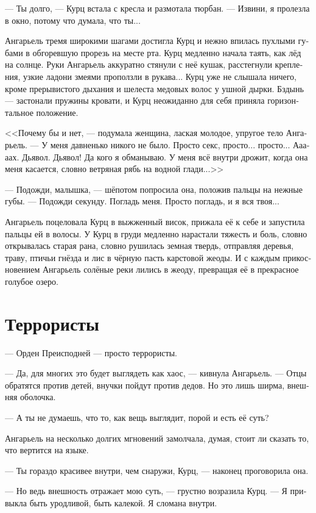 \documentclass[a4paper,12pt,fleqn]{book}\usepackage{cooltooltips}\usepackage{polyglossia}\setdefaultlanguage[babelshorthands=true]{russian}\setotherlanguage{english}\defaultfontfeatures{Ligatures=TeX,Mapping=tex-text} \usepackage{xcolor}\definecolor{lightgray}{HTML}{bbbbbb}\color{lightgray}\newcommand{\ml}[3]{\textenglish{\textcolor{black}{#3}}}
\begin{document}
--- Ты долго, --- Курц встала с кресла и размотала тюрбан.
--- Извини, я пролезла в окно, потому что думала, что ты...

Ангарьель тремя широкими шагами достигла Курц и нежно впилась пухлыми губами в обгоревшую прорезь на месте рта.
Курц медленно начала таять, как лёд на солнце.
Руки Ангарьель аккуратно стянули с неё кушак, расстегнули крепления, узкие ладони змеями проползли в рукава...
Курц уже не слышала ничего, кроме прерывистого дыхания и шелеста медовых волос у ушной дырки.
Бздынь --- застонали пружины кровати, и Курц неожиданно для себя приняла горизонтальное положение.

<<Почему бы и нет, --- подумала женщина, лаская молодое, упругое тело Ангарьель.
--- У меня давненько никого не было.
Просто секс, просто... просто...
Ааааах.
Дьявол.
Дьявол!
Да кого я обманываю.
У меня всё внутри дрожит, когда она меня касается, словно ветряная рябь на водной глади...>>

--- Подожди, малышка, --- шёпотом попросила она, положив пальцы на нежные губы.
--- Подожди секунду.
Погладь меня.
Просто погладь, и я вся твоя...

Ангарьель поцеловала Курц в выжженный висок, прижала её к себе и запустила пальцы ей в волосы.
У Курц в груди медленно нарастали тяжесть и боль, словно открывалась старая рана, словно рушилась земная твердь, отправляя деревья, траву, птичьи гнёзда и лис в чёрную пасть карстовой жеоды.
И с каждым прикосновением Ангарьель солёные реки лились в жеоду, превращая её в прекрасное голубое озеро.

\section{Террористы}

--- Орден Преисподней --- просто террористы.

--- Да, для многих это будет выглядеть как хаос, --- кивнула Ангарьель.
--- Отцы обратятся против детей, внучки пойдут против дедов.
Но это лишь ширма, внешняя оболочка.

--- А ты не думаешь, что то, как вещь выглядит, порой и есть её суть?

Ангарьель на несколько долгих мгновений замолчала, думая, стоит ли сказать то, что вертится на языке.

--- Ты гораздо красивее внутри, чем снаружи, Курц, --- наконец проговорила она.

--- Но ведь внешность отражает мою суть, --- грустно возразила Курц.
--- Я привыкла быть уродливой, быть калекой.
Я сломана внутри.
\end{document}
